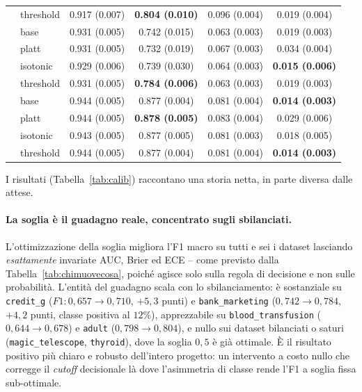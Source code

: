 \begin{table}[h]
\begin{tabular}{llcccc}
 & threshold & 0.917 (0.007) & \textbf{0.804 (0.010)} & 0.096 (0.004) & 0.019 (0.004) \\
\addlinespace
\multirow{4}{*}{\texttt{bank\_marketing}}
 & base      & 0.931 (0.005) & 0.742 (0.015) & 0.063 (0.003) & 0.019 (0.003) \\
 & platt     & 0.931 (0.005) & 0.732 (0.019) & 0.067 (0.003) & 0.034 (0.004) \\
 & isotonic  & 0.929 (0.006) & 0.739 (0.030) & 0.064 (0.003) & \textbf{0.015 (0.006)} \\
 & threshold & 0.931 (0.005) & \textbf{0.784 (0.006)} & 0.063 (0.003) & 0.019 (0.003) \\
\addlinespace
\multirow{4}{*}{\texttt{magic\_telescope}}
 & base      & 0.944 (0.005) & 0.877 (0.004) & 0.081 (0.004) & \textbf{0.014 (0.003)} \\
 & platt     & 0.944 (0.005) & \textbf{0.878 (0.005)} & 0.083 (0.004) & 0.029 (0.006) \\
 & isotonic  & 0.943 (0.005) & 0.877 (0.005) & 0.081 (0.003) & 0.018 (0.005) \\
 & threshold & 0.944 (0.005) & 0.877 (0.004) & 0.081 (0.004) & \textbf{0.014 (0.003)} \\
\bottomrule
\end{tabular}
\end{table}

I risultati (Tabella~\ref{tab:calib}) raccontano una storia netta, in parte
diversa dalle attese.

\paragraph{La soglia è il guadagno reale, concentrato sugli sbilanciati.}
L'ottimizzazione della soglia migliora l'F1 macro su tutti e sei i dataset
lasciando \emph{esattamente} invariate AUC, Brier ed ECE -- come previsto dalla
Tabella~\ref{tab:chimuovecosa}, poiché agisce solo sulla regola di decisione e
non sulle probabilità. L'entità del guadagno scala con lo sbilanciamento: è
sostanziale su \texttt{credit\_g} ($F1: 0{,}657 \to 0{,}710$, $+5{,}3$ punti) e
\texttt{bank\_marketing} ($0{,}742 \to 0{,}784$, $+4{,}2$ punti, classe
positiva al $12\%$), apprezzabile su \texttt{blood\_transfusion}
($0{,}644 \to 0{,}678$) e \texttt{adult} ($0{,}798 \to 0{,}804$), e nullo sui
dataset bilanciati o saturi (\texttt{magic\_telescope}, \texttt{thyroid}), dove
la soglia $0{,}5$ è già ottimale. È il risultato positivo più chiaro e robusto
dell'intero progetto: un intervento a costo nullo che corregge il \emph{cutoff}
decisionale là dove l'asimmetria di classe rende l'F1 a soglia fissa
sub-ottimale.


